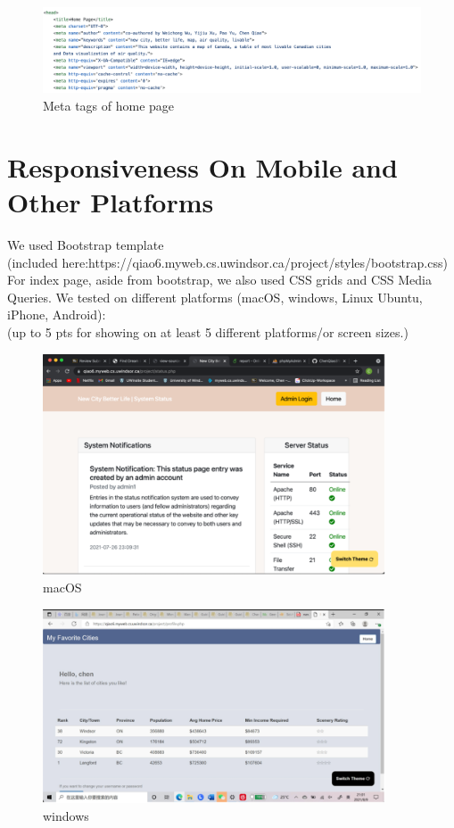 \documentclass[12pt, letterpaper]{article}
\begin{document}
\begin{figure}[htbp]
	\centering
	\includegraphics[width=6in]{images/q11.png}
	\caption{Meta tags of home page}
 \end{figure}

 \newpage

\section{Responsiveness On Mobile and Other Platforms}

We used Bootstrap template \\(included here:https://qiao6.myweb.cs.uwindsor.ca/project/styles/bootstrap.css) 
\\For index page, aside from bootstrap, we also used CSS grids and CSS Media Queries. 
We tested on different platforms (macOS, windows, Linux Ubuntu, iPhone, Android):
\\(up to 5 pts for showing on at least 5 different platforms/or screen sizes.)

\begin{figure}[htbp]
	\centering
	\includegraphics[width=4in]{images/q12_macOS.png}
	\caption{macOS}
 \end{figure}
 
 \begin{figure}[htbp]
	\centering
	\includegraphics[width=4in]{images/q12_windows.png}
	\caption{windows}
 \end{figure}
\end{document}
